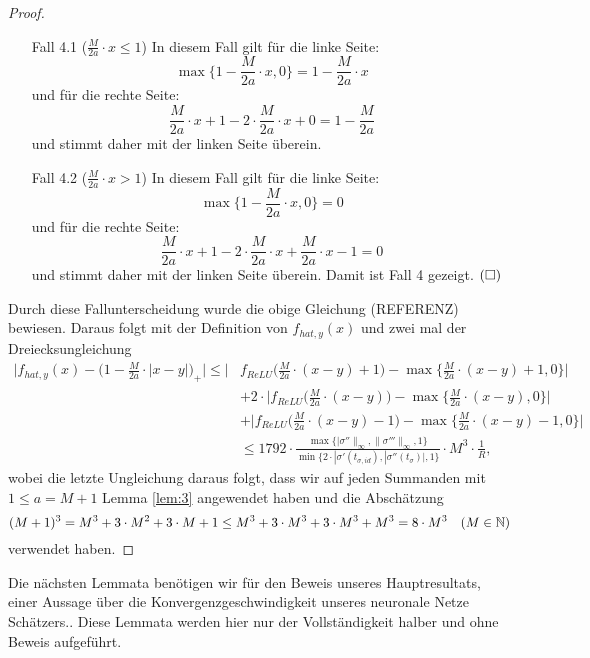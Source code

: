 \begin{proof}
\begin{itemize}
  \item[Fall 4.1] ($\frac{M}{2a} \cdot x \leq 1$) In diesem Fall gilt für die linke Seite$\colon$ 
  $$\max\{1 - \frac{M}{2a} \cdot x, 0\} = 1 - \frac{M}{2a} \cdot x$$ und für die rechte Seite$\colon$ 
  $$\frac{M}{2a} \cdot x + 1 - 2 \cdot \frac{M}{2a} \cdot x + 0 = 1 - \frac{M}{2a}$$ und stimmt daher mit der linken Seite überein.
  \item[Fall 4.2] ($\frac{M}{2a} \cdot x > 1$) In diesem Fall gilt für die linke Seite$\colon$ 
  $$\max\{1 - \frac{M}{2a} \cdot x, 0\} = 0$$ und für die rechte Seite$\colon$ 
  $$\frac{M}{2a} \cdot x + 1 - 2 \cdot \frac{M}{2a} \cdot x + \frac{M}{2a} \cdot x - 1 = 0$$ und stimmt daher mit der linken Seite überein. Damit ist Fall 4 gezeigt. $\hfill(\square)$
\end{itemize} 
Durch diese Fallunterscheidung wurde die obige Gleichung (REFERENZ) bewiesen. Daraus folgt mit der Definition von $f_{hat,y}(x)$ und zwei mal der Dreiecksungleichung
\begin{equation*}
\begin{split}
\bigg|f_{hat,y}(x) - \bigg(1 - \frac{M}{2a} \cdot |x - y|\bigg)_+\bigg| \leq \bigg|&f_{ReLU} \bigg(\frac{M}{2a} \cdot (x - y) + 1\bigg) - \max\{\frac{M}{2a} \cdot (x - y) + 1, 0\}\bigg| \\ 
& + 2 \cdot \bigg|f_{ReLU}\bigg(\frac{M}{2a} \cdot (x - y)\bigg) - \max\{\frac{M}{2a} \cdot (x - y), 0\}\bigg| \\
& + \bigg|f_{ReLU}\bigg(\frac{M}{2a} \cdot (x - y) - 1\bigg) - \max\{\frac{M}{2a} \cdot (x - y) - 1, 0\}\bigg|\\ 
& \leq 1792 \cdot \frac{\max\{|\sigma''\|_{\infty}, \|\sigma'''\|_{\infty}, 1\}}{\min\{2 \cdot |\sigma'(t_{\sigma, id}), |\sigma''(t_{\sigma})|, 1\}} \cdot M^3 \cdot \frac{1}{R},
\end{split}
\end{equation*} 
wobei die letzte Ungleichung daraus folgt, dass wir auf jeden Summanden mit $1 \leq a = M + 1$ Lemma \ref{lem:3} angewendet haben und die Abschätzung 
$$ (M + 1)^3 = M^3 + 3 \cdot M^2 + 3 \cdot M + 1 \leq M^3 + 3 \cdot M^3 + 3 \cdot M ^3 + M^3 = 8 \cdot M^3 \quad (M \in \mathbb{N})$$ verwendet haben.
  \end{proof}
Die nächsten Lemmata benötigen wir für den Beweis unseres Hauptresultats, einer Aussage über die Konvergenzgeschwindigkeit unseres neuronale Netze Schätzers.. Diese Lemmata werden hier nur der Vollständigkeit halber und ohne Beweis aufgeführt.
